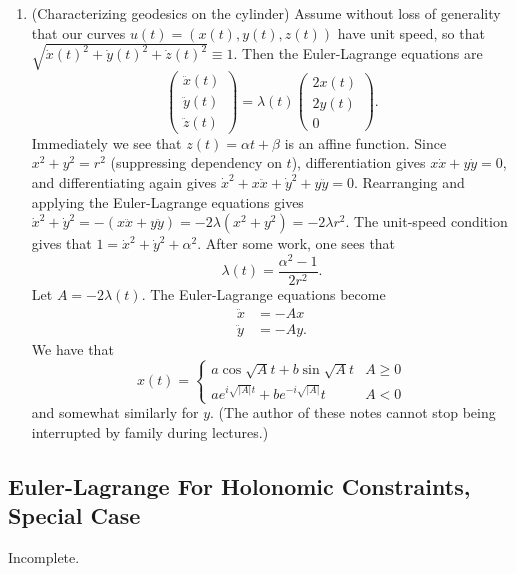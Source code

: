 \documentclass[11pt]{article}
\begin{document}
\begin{enumerate}
\item
(Characterizing geodesics on the cylinder) Assume without loss of generality that our curves $u(t) = (x(t), y(t), z(t))$ have unit speed, so that $\sqrt{\dot{x}(t)^2 + \dot{y}(t)^2 + \dot{z}(t)^2} \equiv 1$. Then the Euler-Lagrange equations are
\[
\begin{pmatrix}
\ddot{x}(t) \\ \ddot{y}(t) \\ \ddot{z}(t)
\end{pmatrix} = \lambda(t) \begin{pmatrix}
2x(t) \\ 2y(t) \\ 0
\end{pmatrix}.
\]
Immediately we see that $z(t) = \alpha t + \beta$ is an affine function. Since $x^2 + y^2 = r^2$ (suppressing dependency on $t$), differentiation gives $x\dot{x} + y\dot{y} = 0$, and differentiating again gives $\dot{x}^2 + x\ddot{x} + \dot{y}^2 + y\ddot{y} = 0$. Rearranging and applying the Euler-Lagrange equations gives $\dot{x}^2 + \dot{y}^2 = -(x\ddot{x} + y\ddot{y}) = -2\lambda(x^2 + y^2) = -2\lambda r^2$. The unit-speed condition gives that $1 = \dot{x}^2 + \dot{y}^2 + \alpha^2$. After some work, one sees that
\[
\lambda(t) = \frac{\alpha^2 - 1}{2r^2}.
\]
Let $A = -2\lambda(t)$. The Euler-Lagrange equations become
\begin{align*}
\ddot{x} &= -A x \\
\ddot{y} &= -A y.
\end{align*}
We have that
\[
x(t) = \begin{cases}
a \cos \sqrt{A}t + b \sin \sqrt{A} t & A \geq 0 \\
a e^{i \sqrt{|A|} t} + b e^{-i \sqrt{|A|}}t & A < 0
\end{cases}
\]
and somewhat similarly for $y$. (The author of these notes cannot stop being interrupted by family during lectures.)
\end{enumerate}

\subsection{Euler-Lagrange For Holonomic Constraints, Special Case}

Incomplete.
\end{document}
